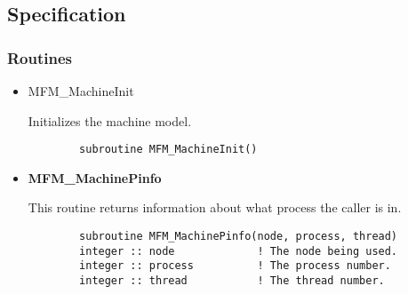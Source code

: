 \subsection{Specification}

\subsubsection{Routines}

\begin{itemize}

\item{MFM\_MachineInit}

Initializes the machine model.

\begin{verbatim}
        subroutine MFM_MachineInit()
\end{verbatim}

\item{\bf MFM\_MachinePinfo}

This routine returns information about what process the caller is in.

\begin{verbatim}
        subroutine MFM_MachinePinfo(node, process, thread)
        integer :: node             ! The node being used.      
        integer :: process          ! The process number.
        integer :: thread           ! The thread number.
\end{verbatim}

\end{itemize}
